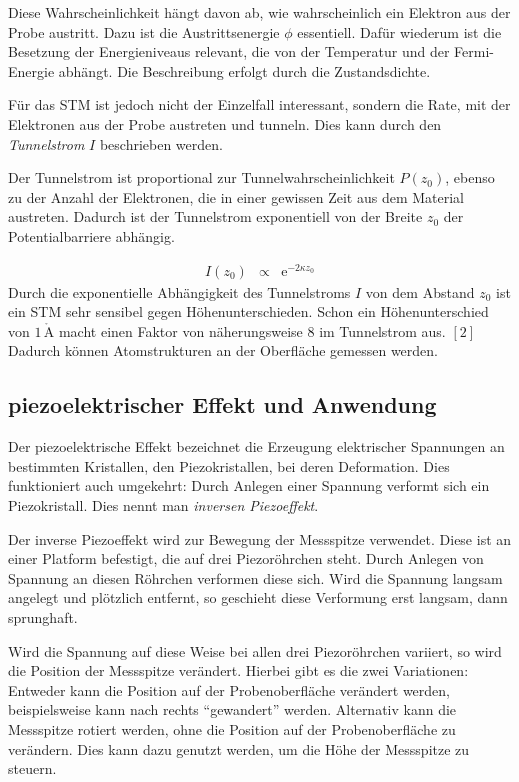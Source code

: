 \documentclass[12pt,a4paper]{scrartcl}
\numberwithin{equation}{section} %
\begin{document}
Diese Wahrscheinlichkeit hängt davon ab, wie wahrscheinlich ein Elektron
aus der Probe austritt. Dazu ist die Austrittsenergie $\phi$
essentiell. Dafür wiederum ist die Besetzung der Energieniveaus
relevant, die von der Temperatur und der Fermi-Energie abhängt. Die
Beschreibung erfolgt durch die Zustandsdichte.

Für das STM ist jedoch nicht der Einzelfall interessant, sondern die
Rate, mit der Elektronen aus der Probe austreten und tunneln. Dies kann
durch den \emph{Tunnelstrom} $I$ beschrieben werden.

Der Tunnelstrom ist proportional zur Tunnelwahrscheinlichkeit
$P(z_0)$, ebenso zu der Anzahl der Elektronen, die in einer gewissen
Zeit aus dem Material austreten. Dadurch ist der Tunnelstrom
exponentiell von der Breite $z_0$ der Potentialbarriere abhängig.

\begin{eqnarray}
    I(z_0) &\propto& \mathrm e^{-2\kappa z_0} \label{I(z)}
\end{eqnarray}
Durch die exponentielle Abhängigkeit des Tunnelstroms $I$ von dem
Abstand $z_0$ ist ein STM sehr sensibel gegen Höhenunterschieden.
Schon ein Höhenunterschied von $1\,\mathrm{\mathring{A}}$ macht einen
Faktor von näherungsweise $8$ im Tunnelstrom aus. $[2]$ Dadurch
können Atomstrukturen an der Oberfläche gemessen werden.

\hypertarget{piezoelektrischer-effekt-und-anwendung}{%
\subsection{piezoelektrischer Effekt und
Anwendung}\label{piezoelektrischer-effekt-und-anwendung}}

Der piezoelektrische Effekt bezeichnet die Erzeugung elektrischer
Spannungen an bestimmten Kristallen, den Piezokristallen, bei deren
Deformation. Dies funktioniert auch umgekehrt: Durch Anlegen einer
Spannung verformt sich ein Piezokristall. Dies nennt man \emph{inversen
Piezoeffekt}.

Der inverse Piezoeffekt wird zur Bewegung der Messspitze verwendet.
Diese ist an einer Platform befestigt, die auf drei Piezoröhrchen steht.
Durch Anlegen von Spannung an diesen Röhrchen verformen diese sich. Wird
die Spannung langsam angelegt und plötzlich entfernt, so geschieht diese
Verformung erst langsam, dann sprunghaft.

Wird die Spannung auf diese Weise bei allen drei Piezoröhrchen variiert,
so wird die Position der Messspitze verändert. Hierbei gibt es die zwei
Variationen: Entweder kann die Position auf der Probenoberfläche
verändert werden, beispielsweise kann nach rechts ``gewandert'' werden.
Alternativ kann die Messspitze rotiert werden, ohne die Position auf der
Probenoberfläche zu verändern. Dies kann dazu genutzt werden, um die
Höhe der Messspitze zu steuern.
\end{document}
